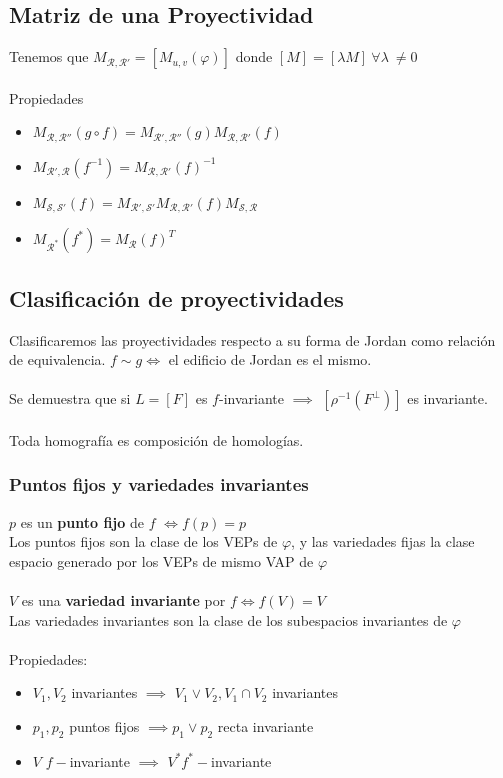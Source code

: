 \documentclass{myclass}
\begin{document}
\subsection{Matriz de una Proyectividad}
Tenemos que $M_{\mathcal{R}, \mathcal{R}'} = [M_{u, v}(\varphi )]$ donde $[M] = [\lambda M]\ \forall \lambda\ \neq 0$ \\
\\
Propiedades
\begin{itemize}
  \item $M_{\mathcal{R}, \mathcal{R}''}(g\circ f)=M_{\mathcal{R}', \mathcal{R}''}(g)M_{\mathcal{R}, \mathcal{R}'}(f)$
  \item $M_{\mathcal{R}', \mathcal{R}}(f^{-1}) = M_{\mathcal{R}, \mathcal{R}'}(f)^{-1}$ 
  \item $M_{\mathcal{S}, \mathcal{S}'}(f) = M_{\mathcal{R}', \mathcal{S}'}M_{\mathcal{R}, \mathcal{R}'}(f) M_{\mathcal{S}, \mathcal{R}}$
  \item $M_{\mathcal{R}^*}(f^*) = M_{\mathcal{R}}(f)^{T}$ 
\end{itemize}

\subsection{Clasificación de proyectividades}
Clasificaremos las proyectividades respecto a su forma de Jordan como relación de equivalencia. $f\sim g \iff$
el edificio de Jordan es el mismo. \\
\\
Se demuestra que si $L = [F]$ es $f$-invariante $\implies$ $[\rho^{-1}(F^\perp)]$ es invariante.\\
\\

Toda homografía es composición de homologías.

\subsubsection{Puntos fijos y variedades invariantes}
$p$ es un \textbf{punto fijo} de  $f$ $\iff f(p)=p$\\
Los puntos fijos son la clase de los VEPs de $\varphi $, y las variedades fijas la clase espacio generado por los VEPs de mismo VAP de $\varphi $ \\
\\
$V$ es una \textbf{variedad invariante} por  $f \iff f(V) = V$\\
Las variedades invariantes son la clase de los subespacios invariantes de $\varphi $ \\
\\
Propiedades:
\begin{itemize}
  \item $V_1, V_2$ invariantes $\implies$ $V_1\lor V_2, V_1\cap V_2$ invariantes
  \item $p_1, p_2$ puntos fijos $\implies p_1\lor p_2$ recta invariante 
  \item $V$ $f-$invariante  $\implies$ $V^* f^*-$invariante
\end{itemize}
\end{document}
